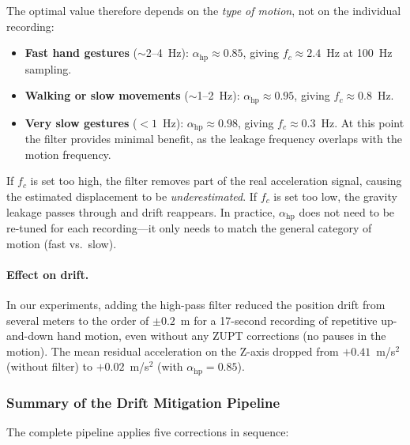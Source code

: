 \noindent The optimal value therefore depends on the \emph{type of motion},
not on the individual recording:

\begin{itemize}
  \item \textbf{Fast hand gestures} ($\sim$2--4~Hz): $\alpha_\text{hp}
        \approx 0.85$, giving $f_c \approx 2.4$~Hz at 100~Hz sampling.
  \item \textbf{Walking or slow movements} ($\sim$1--2~Hz):
        $\alpha_\text{hp} \approx 0.95$, giving $f_c \approx 0.8$~Hz.
  \item \textbf{Very slow gestures} ($< 1$~Hz): $\alpha_\text{hp}
        \approx 0.98$, giving $f_c \approx 0.3$~Hz. At this point the filter
        provides minimal benefit, as the leakage frequency overlaps with the
        motion frequency.
\end{itemize}

\noindent If $f_c$ is set too high, the filter removes part of the real
acceleration signal, causing the estimated displacement to be
\emph{underestimated}. If $f_c$ is set too low, the gravity leakage passes
through and drift reappears. In practice, $\alpha_\text{hp}$ does not need to
be re-tuned for each recording---it only needs to match the general category
of motion (fast vs.\ slow).

\paragraph{Effect on drift.}
In our experiments, adding the high-pass filter reduced the position drift
from several meters to the order of $\pm 0.2$~m for a 17-second recording of
repetitive up-and-down hand motion, even without any ZUPT corrections (no
pauses in the motion). The mean residual acceleration on the Z-axis dropped
from $+0.41$~m/s$^2$ (without filter) to $+0.02$~m/s$^2$ (with
$\alpha_\text{hp} = 0.85$).

\subsubsection{Summary of the Drift Mitigation Pipeline}
\label{sec:proj:pipeline_summary}

The complete pipeline applies five corrections in sequence:


